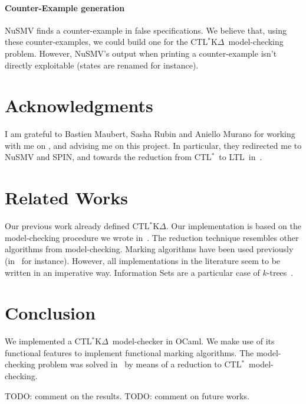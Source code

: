 \documentclass[dvipsnames]{acmart}
\def\ctls{CTL$^{*}$}
\def\ctlskd{CTL$^{*}$K$\Delta$}
\def\ltl{LTL}
\begin{document}
\paragraph{Counter-Example generation}
NuSMV finds a counter-example in false specifications. We believe that, using these counter-examples, we could build one for the \ctlskd\ model-checking problem. However, NuSMV's output when printing a counter-example isn't directly exploitable (states are renamed for instance).

\section{Acknowledgments}
I am grateful to Bastien Maubert, Sasha Rubin and Aniello Murano for working with me on \cite{internship,KR18}, and advising me on this project.
In particular, they redirected me to NuSMV and SPIN, and towards the reduction from \ctls\ to \ltl\ in~\cite{reduction}.

\section{Related Works}
Our previous work already defined \ctlskd. Our implementation is based on the model-checking procedure we wrote in~\cite{internship}.
The reduction technique resembles other algorithms from model-checking.
Marking algorithms have been used previously (in~\cite{reduction} for instance).
However, all implementations in the literature seem to be written in an imperative way.
Information Sets are a particular case of $k$-trees~\cite{ktrees}.


\section{Conclusion}
We implemented a \ctlskd\ model-checker in OCaml. We make use of its functional features to implement functional marking algorithms. The model-checking problem was solved in~\cite{internship} by means of a reduction to \ctls\ model-checking.

TODO: comment on the results.
TODO: comment on future works.



\end{document}
